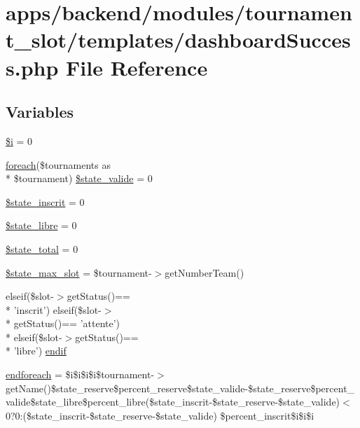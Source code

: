 \hypertarget{dashboard_success_8php}{\section{apps/backend/modules/tournament\-\_\-slot/templates/dashboard\-Success.php File Reference}
\label{dashboard_success_8php}
}
\subsection*{Variables}
\begin{DoxyCompactItemize}
\item 
\hyperlink{dashboard_success_8php_a83018d9153d17d91fbcf3bc10158d34f}{\$i} = 0
\item 
\hyperlink{presse_2modules_2news_2templates_2index_success_8php_abc56db52b2e9a59bcd5c9e45ac5cb332}{foreach}(\$tournaments as \\*
\$tournament) \hyperlink{dashboard_success_8php_af3a474618823746201622a7739282918}{\$state\-\_\-valide} = 0
\item 
\hyperlink{dashboard_success_8php_a60be82fa65f561e562585794494783c9}{\$state\-\_\-inscrit} = 0
\item 
\hyperlink{dashboard_success_8php_ab312d14793b9c36c5991645be5bf68ad}{\$state\-\_\-libre} = 0
\item 
\hyperlink{dashboard_success_8php_a344152e8335a2555919a4fdf6bfa34ca}{\$state\-\_\-total} = 0
\item 
\hyperlink{dashboard_success_8php_a25a9c16257ded9c5abc5490291886b22}{\$state\-\_\-max\-\_\-slot} = \$tournament-\/$>$get\-Number\-Team()
\item 
elseif(\$slot-\/$>$get\-Status()== \\*
'inscrit') elseif(\$slot-\/$>$\\*
get\-Status()== 'attente') \\*
elseif(\$slot-\/$>$get\-Status()== \\*
'libre') \hyperlink{dashboard_success_8php_a8192ceebfb08d806fd4e3012f00f1715}{endif}
\item 
\hyperlink{dashboard_success_8php_a672d9707ef91db026c210f98cc601123}{endforeach} = \$i\$i\$i\$i\$tournament-\/$>$get\-Name()\$state\-\_\-reserve\$percent\-\_\-reserve\$state\-\_\-valide-\/\$state\-\_\-reserve\$percent\-\_\-valide\$state\-\_\-libre\$percent\-\_\-libre(\$state\-\_\-inscrit-\/\$state\-\_\-reserve-\/\$state\-\_\-valide)$<$0?0\-:(\$state\-\_\-inscrit-\/\$state\-\_\-reserve-\/\$state\-\_\-valide) \$percent\-\_\-inscrit\$i\$i\$i

\end{DoxyCompactItemize}
